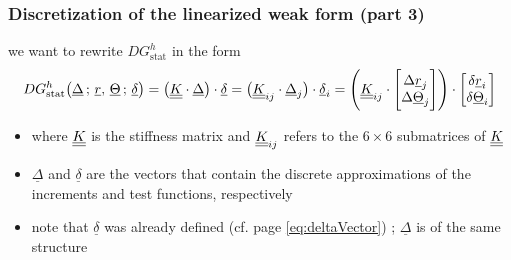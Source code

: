\begin{frame}
\end{frame}


\begin{frame}
  \frametitle{Discretization of the linearized weak form (part 3)}

  we want to rewrite $DG_{\text{stat}}^h$ in the form
  \begin{displaymath}
    DG_{\text{stat}}^h \bigl( \underline{\Delta} \, ; \, \underline{r} , \, \underline{\Theta} \, ; \, \underline{\delta} \bigr) =
    \bigl( \underline{\underline{K}} \cdot \underline{\Delta} \bigr) \cdot \underline{\delta} =
    \bigl( \underline{\underline{K}}_{ij} \cdot \underline{\Delta}_j \bigr) \cdot \underline{\delta}_i =
    \Biggl( \underline{\underline{K}}_{ij} \cdot
    \begin{bmatrix}
      \Delta \underline{r}_j \\
      \Delta \underline{\Theta}_j
    \end{bmatrix}
    \Biggr) \cdot 
    \begin{bmatrix}
      \delta \underline{r}_i \\
      \delta \underline{\Theta}_i
    \end{bmatrix}    
  \end{displaymath}
  \begin{itemize}
    \item where $\underline{\underline{K}}$ is the stiffness matrix and $\underline{\underline{K}}_{ij}$ refers to the $6 \times 6$ submatrices of $\underline{\underline{K}}$
    \item $\underline{\Delta}$ and $\underline{\delta}$ are the vectors that contain the discrete approximations of the increments and test functions, respectively
    \item note that $\underline{\delta}$ was already defined (cf. page \autoref{eq:deltaVector}) ; $\underline{\Delta}$ is of the same structure
  \end{itemize}
  

\end{frame}

